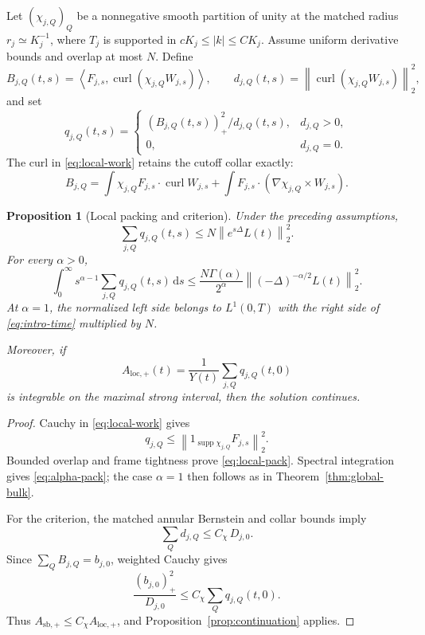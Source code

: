 \documentclass[11pt]{article}
\newtheorem{proposition}[theorem]{Proposition}
\theoremstyle{definition}
\newcommand{\curl}{\operatorname{curl}}
\newcommand{\supp}{\operatorname{supp}}
\newcommand{\ip}[2]{\left\langle #1,#2\right\rangle}
\newcommand{\norm}[1]{\left\lVert #1\right\rVert}
\newcommand{\abs}[1]{\left\lvert #1\right\rvert}
\newcommand{\pos}[1]{\left(#1\right)_{+}}
\newcommand{\dd}{\,\mathrm d}
\begin{document}
Let \((\chi_{j,Q})_Q\) be a nonnegative smooth partition of unity at the
matched radius \(r_j\simeq K_j^{-1}\), where \(T_j\) is supported in
\(cK_j\le\abs{k}\le CK_j\).  Assume uniform derivative bounds and overlap
at most \(N\).  Define
\begin{equation}\label{eq:local-work}
 B_{j,Q}(t,s)=\ip{F_{j,s}}{\curl(\chi_{j,Q}W_{j,s})},
 \qquad
 d_{j,Q}(t,s)=\norm{\curl(\chi_{j,Q}W_{j,s})}_2^2,
\end{equation}
and set
\begin{equation}\label{eq:local-q}
 q_{j,Q}(t,s)=
 \begin{cases}
 \pos{B_{j,Q}(t,s)}^2/d_{j,Q}(t,s),&d_{j,Q}>0,\\
 0,&d_{j,Q}=0.
 \end{cases}
\end{equation}
The curl in \eqref{eq:local-work} retains the cutoff collar exactly:
\[
 B_{j,Q}
 =\int\chi_{j,Q}F_{j,s}\cdot\curl W_{j,s}
 +\int F_{j,s}\cdot(\nabla\chi_{j,Q}\times W_{j,s}).
\]

\begin{proposition}[Local packing and criterion]\label{prop:local}
Under the preceding assumptions,
\begin{equation}\label{eq:local-pack}
 \sum_{j,Q}q_{j,Q}(t,s)
 \le N\norm{e^{s\Delta}L(t)}_2^2.
\end{equation}
For every \(\alpha>0\),
\begin{equation}\label{eq:alpha-pack}
 \int_0^\infty s^{\alpha-1}\sum_{j,Q}q_{j,Q}(t,s)\dd s
 \le\frac{N\Gamma(\alpha)}{2^\alpha}
 \norm{(-\Delta)^{-\alpha/2}L(t)}_2^2.
\end{equation}
At \(\alpha=1\), the normalized left side belongs to \(L^1(0,T)\) with
the right side of \eqref{eq:intro-time} multiplied by \(N\).

Moreover, if
\begin{equation}\label{eq:Aloc}
 A_{\mathrm{loc},+}(t)
 =\frac1{Y(t)}\sum_{j,Q}q_{j,Q}(t,0)
\end{equation}
is integrable on the maximal strong interval, then the solution continues.
\end{proposition}

\begin{proof}
Cauchy in \eqref{eq:local-work} gives
\[
 q_{j,Q}\le
 \norm{1_{\supp\chi_{j,Q}}F_{j,s}}_2^2.
\]
Bounded overlap and frame tightness prove \eqref{eq:local-pack}.  Spectral
integration gives \eqref{eq:alpha-pack}; the case \(\alpha=1\) then follows
as in Theorem~\ref{thm:global-bulk}.

For the criterion, the matched annular Bernstein and collar bounds imply
\[
 \sum_Qd_{j,Q}\le C_{\chi}\,D_{j,0}.
\]
Since \(\sum_QB_{j,Q}=b_{j,0}\), weighted Cauchy gives
\[
 \frac{\pos{b_{j,0}}^2}{D_{j,0}}
 \le C_{\chi}\sum_Qq_{j,Q}(t,0).
\]
Thus \(A_{\mathrm{sb},+}\le C_{\chi}A_{\mathrm{loc},+}\), and
Proposition~\ref{prop:continuation} applies.
\end{proof}
\end{document}
